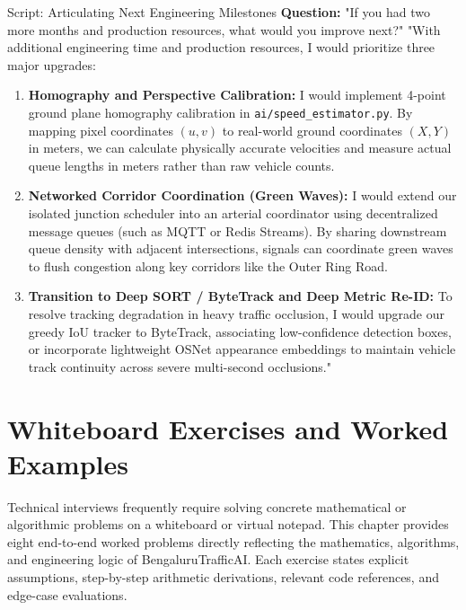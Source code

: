 \documentclass[11pt,a4paper,oneside]{report}
\begin{document}
\begin{interviewq}{Script: Articulating Next Engineering Milestones}
\textbf{Question:} "If you had two more months and production resources, what would you improve next?"
\tcblower
"With additional engineering time and production resources, I would prioritize three major upgrades:

\begin{enumerate}
    \item \textbf{Homography and Perspective Calibration:} I would implement 4-point ground plane homography calibration in \texttt{ai/speed\_estimator.py}. By mapping pixel coordinates $(u, v)$ to real-world ground coordinates $(X, Y)$ in meters, we can calculate physically accurate velocities and measure actual queue lengths in meters rather than raw vehicle counts.
    \item \textbf{Networked Corridor Coordination (Green Waves):} I would extend our isolated junction scheduler into an arterial coordinator using decentralized message queues (such as MQTT or Redis Streams). By sharing downstream queue density with adjacent intersections, signals can coordinate green waves to flush congestion along key corridors like the Outer Ring Road.
    \item \textbf{Transition to Deep SORT / ByteTrack and Deep Metric Re-ID:} To resolve tracking degradation in heavy traffic occlusion, I would upgrade our greedy IoU tracker to ByteTrack, associating low-confidence detection boxes, or incorporate lightweight OSNet appearance embeddings to maintain vehicle track continuity across severe multi-second occlusions."
\end{enumerate}
\end{interviewq}



\chapter{Whiteboard Exercises and Worked Examples}
\label{ch:whiteboard_exercises}

Technical interviews frequently require solving concrete mathematical or algorithmic problems on a whiteboard or virtual notepad. This chapter provides eight end-to-end worked problems directly reflecting the mathematics, algorithms, and engineering logic of BengaluruTrafficAI. Each exercise states explicit assumptions, step-by-step arithmetic derivations, relevant code references, and edge-case evaluations.
\end{document}
